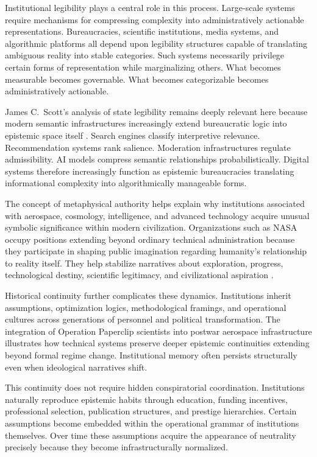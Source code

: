 \documentclass[11pt,a4paper]{article}
\begin{document}
Institutional legibility plays a central role in this process. Large-scale systems require mechanisms for compressing complexity into administratively actionable representations. Bureaucracies, scientific institutions, media systems, and algorithmic platforms all depend upon legibility structures capable of translating ambiguous reality into stable categories. Such systems necessarily privilege certain forms of representation while marginalizing others. What becomes measurable becomes governable. What becomes categorizable becomes administratively actionable.

James C.\ Scott's analysis of state legibility remains deeply relevant here because modern semantic infrastructures increasingly extend bureaucratic logic into epistemic space itself \cite{scott1998}. Search engines classify interpretive relevance. Recommendation systems rank salience. Moderation infrastructures regulate admissibility. AI models compress semantic relationships probabilistically. Digital systems therefore increasingly function as epistemic bureaucracies translating informational complexity into algorithmically manageable forms.

The concept of metaphysical authority helps explain why institutions associated with aerospace, cosmology, intelligence, and advanced technology acquire unusual symbolic significance within modern civilization. Organizations such as NASA occupy positions extending beyond ordinary technical administration because they participate in shaping public imagination regarding humanity's relationship to reality itself. They help stabilize narratives about exploration, progress, technological destiny, scientific legitimacy, and civilizational aspiration \cite{mcdougall1985}.

Historical continuity further complicates these dynamics. Institutions inherit assumptions, optimization logics, methodological framings, and operational cultures across generations of personnel and political transformation. The integration of Operation Paperclip scientists into postwar aerospace infrastructure illustrates how technical systems preserve deeper epistemic continuities extending beyond formal regime change. Institutional memory often persists structurally even when ideological narratives shift.

This continuity does not require hidden conspiratorial coordination. Institutions naturally reproduce epistemic habits through education, funding incentives, professional selection, publication structures, and prestige hierarchies. Certain assumptions become embedded within the operational grammar of institutions themselves. Over time these assumptions acquire the appearance of neutrality precisely because they become infrastructurally normalized.
\end{document}
